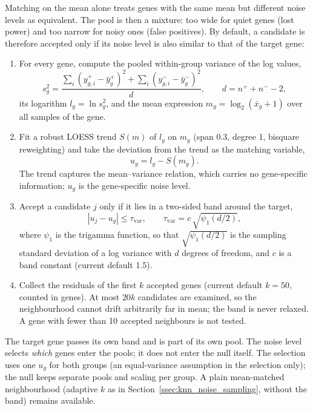             Matching on the mean alone treats genes with the same mean but different noise levels as equivalent. The pool is then a mixture: too wide for quiet genes (lost power) and too narrow for noisy ones (false positives). By default, a candidate is therefore accepted only if its noise level is also similar to that of the target gene:

            \begin{enumerate}
                \item For every gene, compute the pooled within-group variance of the log values,
                      \[
                          s^2_g = \frac{\sum_i \left(y^{+}_{g,i} - \bar{y}^{+}_{g}\right)^2 + \sum_i \left(y^{-}_{g,i} - \bar{y}^{-}_{g}\right)^2}{d}, \qquad d = n^{+} + n^{-} - 2,
                      \]
                      its logarithm $l_g = \ln s^2_g$, and the mean expression $m_g = \log_2(\bar{x}_g + 1)$ over all samples of the gene.
                \item Fit a robust LOESS trend $S(m)$ of $l_g$ on $m_g$ (span 0.3, degree 1, bisquare reweighting) and take the deviation from the trend as the matching variable,
                      \[
                          u_g = l_g - S(m_g).
                      \]
                      The trend captures the mean--variance relation, which carries no gene-specific information; $u_g$ is the gene-specific noise level.
                \item Accept a candidate $j$ only if it lies in a two-sided band around the target,
                      \[
                          |u_j - u_g| \le \tau_{\mathrm{var}}, \qquad \tau_{\mathrm{var}} = c\,\sqrt{\psi_1(d/2)},
                      \]
                      where $\psi_1$ is the trigamma function, so that $\sqrt{\psi_1(d/2)}$ is the sampling standard deviation of a log variance with $d$ degrees of freedom, and $c$ is a band constant (current default 1.5).
                \item Collect the residuals of the first $k$ accepted genes (current default $k = 50$, counted in genes). At most $20k$ candidates are examined, so the neighbourhood cannot drift arbitrarily far in mean; the band is never relaxed. A gene with fewer than 10 accepted neighbours is not tested.
            \end{enumerate}

            The target gene passes its own band and is part of its own pool. The noise level selects \emph{which} genes enter the pools; it does not enter the null itself. The selection uses one $u_g$ for both groups (an equal-variance assumption in the selection only); the null keeps separate pools and scaling per group. A plain mean-matched neighbourhood (adaptive $k$ as in Section~\ref{ssec:knn_noise_sampling}, without the band) remains available.

